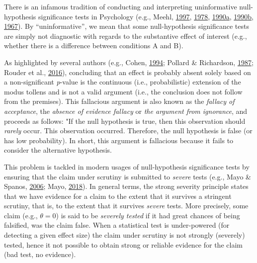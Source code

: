 \documentclass[
  english,
  man, donotrepeattitle,floatsintext]{apa6}
\begin{document}
There is an infamous tradition of conducting and interpreting uninformative null-hypothesis significance tests in Psychology (e.g., Meehl, \protect\hyperlink{ref-harlow_problem_1997}{1997}, \protect\hyperlink{ref-meehl_theoretical_1978}{1978}, \protect\hyperlink{ref-meehl_why_1990}{1990}\protect\hyperlink{ref-meehl_why_1990}{a}, \protect\hyperlink{ref-meehl_appraising_1990-1}{1990}\protect\hyperlink{ref-meehl_appraising_1990-1}{b}, \protect\hyperlink{ref-meehl_theory-testing_1967}{1967}). By ``uninformative'', we mean that some null-hypothesis significance tests are simply not diagnostic with regards to the substantive effect of interest (e.g., whether there is a difference between conditions A and B).

As highlighted by several authors (e.g., Cohen, \protect\hyperlink{ref-cohen_earth_1994}{1994}; Pollard \& Richardson, \protect\hyperlink{ref-pollard_probability_1987}{1987}; Rouder et al., \protect\hyperlink{ref-rouder_is_2016}{2016}), concluding that an effect is probably absent solely based on a non-significant \emph{p}-value is the continuous (i.e., probabilistic) extension of the modus tollens and is not a valid argument (i.e., the conclusion does not follow from the premises). This fallacious argument is also known as the \emph{fallacy of acceptance}, the \emph{absence of evidence fallacy} or \emph{the argument from ignorance}, and proceeds as follows: "If the null hypothesis is true, then this observation should \emph{rarely} occur. This observation occurred. Therefore, the null hypothesis is false (or has low probability). In short, this argument is fallacious because it fails to consider the alternative hypothesis.

This problem is tackled in modern usages of null-hypothesis significance tests by ensuring that the claim under scrutiny is submitted to \emph{severe} tests (e.g., Mayo \& Spanos, \protect\hyperlink{ref-mayo_severe_2006}{2006}; Mayo, \protect\hyperlink{ref-mayo_statistical_2018}{2018}). In general terms, the strong severity principle states that we have evidence for a claim to the extent that it survives a stringent scrutiny, that is, to the extent that it survives \emph{severe} tests. More precisely, some claim (e.g., \(\theta = 0\)) is said to be \emph{severely tested} if it had great chances of being falsified, was the claim false. When a statistical test is under-powered (for detecting a given effect size) the claim under scrutiny is not strongly (severely) tested, hence it not possible to obtain strong or reliable evidence for the claim (bad test, no evidence).
\end{document}
